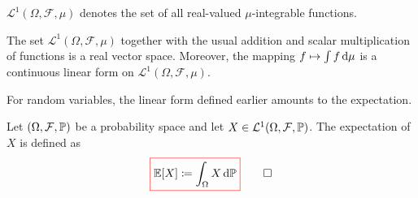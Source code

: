 \begin{definition}\label{def:L1-space}
\(
\mathcal{L}^1(\Omega,\mathcal{F},\mu)
\) denotes the set of all real-valued $\mu$-integrable functions.
\end{definition}

\begin{lemma}\label{lem:L1-vector-space}
The set $\mathcal{L}^1(\Omega,\mathcal{F},\mu)$ together with the usual addition and scalar multiplication of functions is a real vector space.
Moreover, the mapping
\(
f \mapsto \int f\,\mathrm{d}\mu
\)
is a continuous linear form on $\mathcal{L}^1(\Omega,\mathcal{F},\mu)$.
\end{lemma}

For random variables, the linear form defined earlier amounts to the expectation.

\begin{definition}\label{def:expectation}
Let $(\Omega,\mathcal{F},\mathbb{P})$ be a probability space and let $X \in \mathcal{L}^1(\Omega,\mathcal{F},\mathbb{P})$.
The expectation of $X$ is defined as
\begin{equation}\label{eq:expectation}
{\color{red}\boxed{\color{black}
\operatorname{\mathbb{E}}[X]
\coloneq
\int_{\Omega} X\,\mathrm{d}\mathbb{P}}}
\qedhere
\end{equation}
\end{definition}



